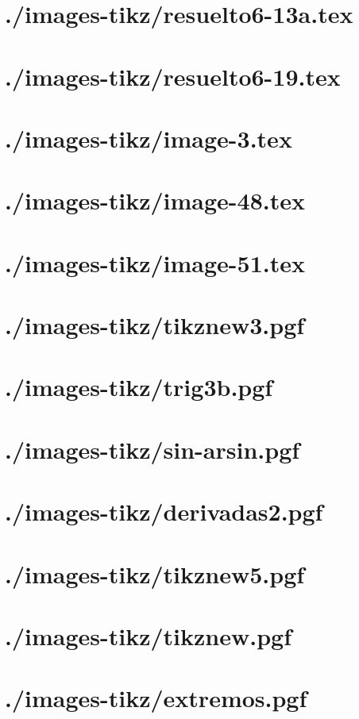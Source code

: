\documentclass[]{article}
\begin{document}
\section{./images-tikz/resuelto6-13a.tex} 
\section{./images-tikz/resuelto6-19.tex} 
\section{./images-tikz/image-3.tex} 
\section{./images-tikz/image-48.tex} 
\section{./images-tikz/image-51.tex} 
\section{./images-tikz/tikznew3.pgf} 
\section{./images-tikz/trig3b.pgf} 
\section{./images-tikz/sin-arsin.pgf} 
\section{./images-tikz/derivadas2.pgf} 
\section{./images-tikz/tikznew5.pgf} 
\section{./images-tikz/tikznew.pgf} 
\section{./images-tikz/extremos.pgf} 
\end{document}
